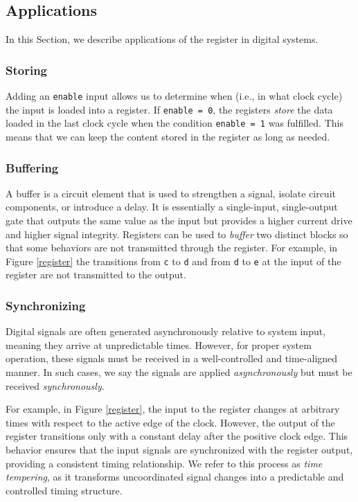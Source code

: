 \subsection{Applications}
In this Section, we describe applications of the register in digital systems.

\subsubsection{Storing}
Adding an {\tt enable} input allows us to determine when (i.e., in what
clock cycle) the input is loaded into a register. If {\tt enable =
0}, the registers {\em store} the data loaded in the last clock
cycle when the condition {\tt enable = 1} was fulfilled. This
means that we can keep the content stored in the register as
 long as needed.

\subsubsection{Buffering}
A buffer is a circuit element that is used to strengthen a signal, isolate circuit components, or introduce a delay. It is essentially a single-input, single-output gate that outputs the same value as the input but provides a higher current drive and higher signal integrity. Registers can be used to {\em buffer} two distinct blocks so that some behaviors are not
transmitted through the register. For example, in Figure
\ref{register} the transitions from {\tt c} to {\tt d} and from
{\tt d} to {\tt e} at the input of the register are not
transmitted to the output.

\subsubsection{Synchronizing}
Digital signals are often generated asynchronously relative to system input, meaning they arrive at unpredictable times. However, for proper system operation, these signals must be received in a well-controlled and time-aligned manner. In such cases, we say the signals are applied \textit{asynchronously} but must be received \textit{synchronously}. 

For example, in Figure \ref{register}, the input to the register changes at arbitrary times with respect to the active edge of the clock. However, the output of the register transitions only with a constant delay after the positive clock edge. This behavior ensures that the input signals are synchronized with the register output, providing a consistent timing relationship. We refer to this process as \textit{time tempering}, as it transforms uncoordinated signal changes into a predictable and controlled timing structure.

